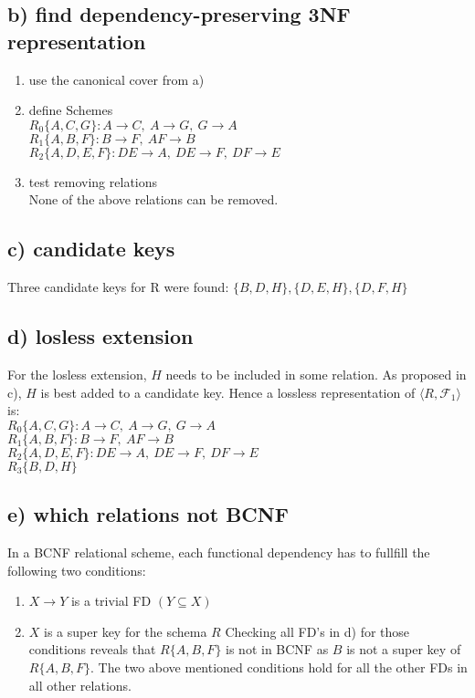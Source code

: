 \documentclass[a4paper,11pt,twoside]{article}
\newcommand{\fdep}[2]{{\mathit{#1}} \rightarrow {\mathit{#2}}}
\begin{document}
\subsection*{b) find dependency-preserving 3NF representation}
\begin{enumerate}
\item use the canonical cover from a)
\item define Schemes\\
  $R_0\{A, C, G\}: \fdep{A}{C},\ \fdep{A}{G},\ \fdep{G}{A}$\\
  $R_1\{A, B, F\}: \fdep{B}{F},\ \fdep{AF}{B}$\\
  $R_2\{A, D, E, F\}: \fdep{DE}{A},\ \fdep{DE}{F},\ \fdep{DF}{E}$\\
  
\item test removing relations\\
None of the above relations can be removed. 
\end{enumerate}

\subsection*{c) candidate keys}
Three candidate keys for R were found: $\{B,D,H\}, \{D,E,H\}, \{D,F,H\}$

\subsection*{d) losless extension}
For the losless extension, $H$ needs to be included in some relation. As proposed in c), $H$ is best added to a candidate key. Hence a lossless representation of $\langle R,\mathcal{F}_1 \rangle$ is: \\
$R_0\{A, C, G\}: \fdep{A}{C},\ \fdep{A}{G},\ \fdep{G}{A}$\\
$R_1\{A, B, F\}: \fdep{B}{F},\ \fdep{AF}{B}$\\
$R_2\{A, D, E, F\}: \fdep{DE}{A},\ \fdep{DE}{F},\ \fdep{DF}{E}$\\
$R_3\{B, D, H\}$\\


\subsection*{e) which relations not BCNF}
In a BCNF relational scheme, each functional dependency has to fullfill the following two conditions:
\begin{enumerate}
\item $\fdep{X}{Y}$ is a trivial FD $(Y \subseteq X)$
\item $X$ is a super key for the schema $R$
Checking all FD's in d) for those conditions reveals that $R\{A,B,F\}$ is not in BCNF as $B$ is not a super key of $R\{A,B,F\}$. The two above mentioned conditions hold for all the other FDs in all other relations. 

\end{enumerate}
\end{document}
